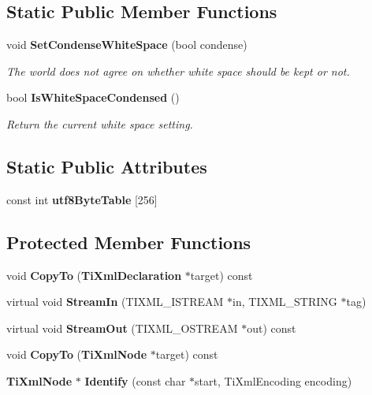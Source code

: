 \subsection*{Static Public Member Functions}
\begin{CompactItemize}
\item 
void {\bf Set\-Condense\-White\-Space} (bool condense)
\begin{CompactList}\small\item\em The world does not agree on whether white space should be kept or not. \item\end{CompactList}\item 
bool {\bf Is\-White\-Space\-Condensed} ()\label{classTiXmlBase_TiXmlUnknowne1}

\begin{CompactList}\small\item\em Return the current white space setting. \item\end{CompactList}\end{CompactItemize}
\subsection*{Static Public Attributes}
\begin{CompactItemize}
\item 
const int {\bf utf8Byte\-Table} [256]
\end{CompactItemize}
\subsection*{Protected Member Functions}
\begin{CompactItemize}
\item 
void {\bf Copy\-To} ({\bf Ti\-Xml\-Declaration} $\ast$target) const\label{classTiXmlDeclaration_TiXmlDeclarationb0}

\item 
virtual void {\bf Stream\-In} (TIXML\_\-ISTREAM $\ast$in, TIXML\_\-STRING $\ast$tag)\label{classTiXmlDeclaration_TiXmlDeclarationb1}

\item 
virtual void {\bf Stream\-Out} (TIXML\_\-OSTREAM $\ast$out) const\label{classTiXmlDeclaration_TiXmlDeclarationb2}

\item 
void {\bf Copy\-To} ({\bf Ti\-Xml\-Node} $\ast$target) const\label{classTiXmlNode_TiXmlUnknownb3}

\item 
{\bf Ti\-Xml\-Node} $\ast$ {\bf Identify} (const char $\ast$start, Ti\-Xml\-Encoding encoding)\label{classTiXmlNode_TiXmlUnknownb4}

\end{CompactItemize}
